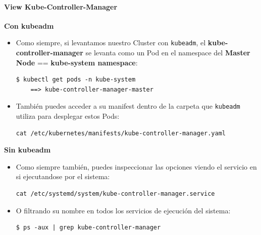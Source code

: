 \documentclass{article}
\newenvironment{codetemplate}[1][]{%
  \mybasecolorbox[#1]
  \itshape
}{%
  \endmybasecolorbox
}
\begin{document}
\paragraph{View Kube-Controller-Manager}

\textbf{Con kubeadm}

\begin{itemize}
    \item Como siempre, si levantamos nuestro Cluster con \verb|kubeadm|, el \textbf{kube-controller-manager} se levanta como un Pod en el namespace del \textbf{Master Node} == \textbf{kube-system namespace}:
\begin{codetemplate}{}
\begin{verbatim}
$ kubectl get pods -n kube-system
    ==> kube-controller-manager-master
\end{verbatim}
\end{codetemplate}

    \item También puedes acceder a su manifest dentro de la carpeta que \verb|kubeadm| utiliza para desplegar estos Pods:
\begin{codetemplate}{}
\begin{verbatim}
cat /etc/kubernetes/manifests/kube-controller-manager.yaml
\end{verbatim}
\end{codetemplate}
\end{itemize}

\textbf{Sin kubeadm}

\begin{itemize}
    \item Como siempre también, puedes inspeccionar las opciones viendo el servicio en si ejecutandose por el sistema:
\begin{codetemplate}{}
\begin{verbatim}
cat /etc/systemd/system/kube-controller-manager.service
\end{verbatim}
\end{codetemplate}

    \item O filtrando su nombre en todos los servicios de ejecución del sistema:
\begin{codetemplate}{}
\begin{verbatim}
$ ps -aux | grep kube-controller-manager
\end{verbatim}
\end{codetemplate}
\end{itemize}
\end{document}

